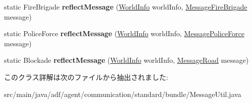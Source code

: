 \begin{DoxyCompactItemize}
static Fire\+Brigade {\bfseries reflect\+Message} (\hyperlink{classadf_1_1agent_1_1info_1_1WorldInfo}{World\+Info} world\+Info, \hyperlink{classadf_1_1agent_1_1communication_1_1standard_1_1bundle_1_1information_1_1MessageFireBrigade}{Message\+Fire\+Brigade} message)
\item 
\hypertarget{classadf_1_1agent_1_1communication_1_1standard_1_1bundle_1_1MessageUtil_a8e0ffb2481d2edaa6388f4d279f4db44}{}\label{classadf_1_1agent_1_1communication_1_1standard_1_1bundle_1_1MessageUtil_a8e0ffb2481d2edaa6388f4d279f4db44} 
static Police\+Force {\bfseries reflect\+Message} (\hyperlink{classadf_1_1agent_1_1info_1_1WorldInfo}{World\+Info} world\+Info, \hyperlink{classadf_1_1agent_1_1communication_1_1standard_1_1bundle_1_1information_1_1MessagePoliceForce}{Message\+Police\+Force} message)
\item 
\hypertarget{classadf_1_1agent_1_1communication_1_1standard_1_1bundle_1_1MessageUtil_af20c0c32fa83c965a4cc7158ef952fd8}{}\label{classadf_1_1agent_1_1communication_1_1standard_1_1bundle_1_1MessageUtil_af20c0c32fa83c965a4cc7158ef952fd8} 
static Blockade {\bfseries reflect\+Message} (\hyperlink{classadf_1_1agent_1_1info_1_1WorldInfo}{World\+Info} world\+Info, \hyperlink{classadf_1_1agent_1_1communication_1_1standard_1_1bundle_1_1information_1_1MessageRoad}{Message\+Road} message)
\end{DoxyCompactItemize}


このクラス詳解は次のファイルから抽出されました\+:\begin{DoxyCompactItemize}
\item 
src/main/java/adf/agent/communication/standard/bundle/Message\+Util.\+java\end{DoxyCompactItemize}

